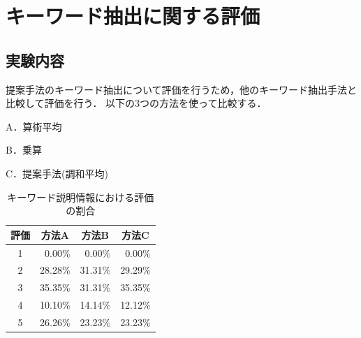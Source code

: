\documentclass[submit,techrep,noauthor]{ipsj}
\begin{document}
%
%



\section{キーワード抽出に関する評価}
\label{sec:キーワード抽出評価}
\subsection{実験内容}
提案手法のキーワード抽出について評価を行うため，他のキーワード抽出手法と比較して評価を行う．
以下の3つの方法を使って比較する．
\begin{description}
  \item A．算術平均
  \item B．乗算
  \item C．提案手法(調和平均)
\end{description}

\begin{table}[t]
  \caption{キーワード説明情報における評価の割合}
  \label{table:キーワード説明情報における評価の割合}
  \centering
  \begin{tabular}{c|r|r|r}
  \hline
  評価 & \multicolumn{1}{c|}{方法A} & \multicolumn{1}{c|}{方法B} & \multicolumn{1}{c}{方法C} \\ \hline
  1  & 0.00\%                   & 0.00\%                   & 0.00\%                  \\
  2  & 28.28\%                  & 31.31\%                  & 29.29\%                 \\
  3  & 35.35\%                  & 31.31\%                  & 35.35\%                 \\
  4  & 10.10\%                   & 14.14\%                  & 12.12\%                 \\
  5  & 26.26\%                  & 23.23\%                  & 23.23\%                 \\ \hline
  \end{tabular}
\end{table}
\end{document}

